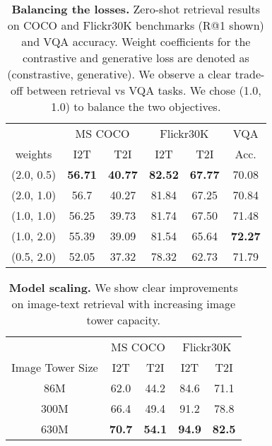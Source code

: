 \documentclass[10pt]{article} \usepackage[accepted]{tmlr}
\newcommand{\tablestyle}[2]{\setlength{\tabcolsep}{#1}\renewcommand{\arraystretch}{#2}\centering\footnotesize}
\begin{document}
\begin{table}\centering
\small
\tablestyle{8pt}{1.1}
\begin{tabular}{c|cc|cc|c}
& 
\multicolumn{2}{c|}{MS COCO} & \multicolumn{2}{c}{Flickr30K} & \multicolumn{1}{c}{VQA} \\
 weights & I2T & T2I &I2T &T2I &Acc. \\ 
\hline
(2.0, 0.5)  & \bf{56.71}    & \bf{40.77}  
        & \bf{82.52}    & \bf{67.77}    & 70.08\\
(2.0, 1.0)  & 56.7   & 40.27  
        & 81.84   & 67.25  & 70.84 \\
(1.0, 1.0)  & 56.25   & 39.73  
        & 81.74   & 67.50  & 71.48 \\
(1.0, 2.0)  & 55.39   & 39.09  
        & 81.54   & 65.64  & \bf{72.27} \\
(0.5, 2.0)  & 52.05   & 37.32  
        & 78.32  & 62.73  & 71.79 \\
\hline
\end{tabular}
\vspace{-1mm}
\caption{\textbf{Balancing the losses.} Zero-shot retrieval results on COCO and Flickr30K benchmarks (R@1 shown) and VQA accuracy. Weight coefficients for the contrastive and generative loss are denoted as (constrastive, generative). We observe a clear trade-off between retrieval vs VQA tasks. We chose (1.0, 1.0) to balance the two objectives.
}
\label{tab:ablation_balancing}
\vspace{-1mm}
\end{table}




\begin{table}\centering
\small
\tablestyle{8pt}{1.1}
\begin{tabular}{c|cc|cc}
& \multicolumn{2}{c|}{MS COCO} & \multicolumn{2}{c}{Flickr30K} \\
Image Tower Size & I2T & T2I &I2T &T2I \\ 
\hline
86M  & 62.0  & 44.2  & 84.6   & 71.1  \\
300M  & 66.4  & 49.4  & 91.2    & 78.8   \\
630M  & \bf{70.7}   & \bf{54.1} & \bf{94.9}   & \bf{82.5}  \\
\hline
\end{tabular}
\vspace{-1mm}
\caption{\textbf{Model scaling.} We show clear improvements on image-text retrieval with increasing image tower capacity. }
\label{tab:ablation_scale}
\vspace{-2mm}
\end{table}
\end{document}
